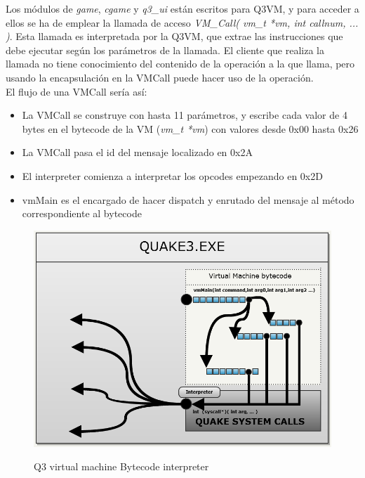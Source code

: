\documentclass[a4paper,12pt]{report}
\begin{document}
	Los módulos de \textit{game}, \textit{cgame} y \textit{q3\_ui} están escritos para Q3VM, y para acceder a ellos se ha de emplear la llamada de acceso \textit{VM\_Call( vm\_t *vm, int callnum, ... )}. Esta llamada es interpretada por la Q3VM, que extrae las instrucciones que debe ejecutar según los parámetros de la llamada. El cliente que realiza la llamada no tiene conocimiento del contenido de la operación a la que llama, pero usando la encapsulación en la VMCall puede hacer uso de la operación.\\
	
	El flujo de una VMCall sería así:
	
	\begin{itemize}  
		\item La VMCall se construye con hasta 11 parámetros, y escribe cada valor de 4 bytes en el bytecode de la VM (\textit{vm\_t *vm}) con valores desde 0x00 hasta 0x26
		\item La VMCall pasa el id del mensaje localizado en 0x2A
		\item El interpreter comienza a interpretar los opcodes empezando en 0x2D
		\item vmMain es el encargado de hacer dispatch y enrutado del mensaje al método correspondiente al bytecode
	\end{itemize}

	\begin{center}
		\begin{figure}[h]
			\includegraphics[width=1\textwidth]{images/vm_bb}
			\label{fig:q3vm_bb}
			\caption{Q3 virtual machine Bytecode interpreter}
		\end{figure}
	\end{center}
\end{document}
